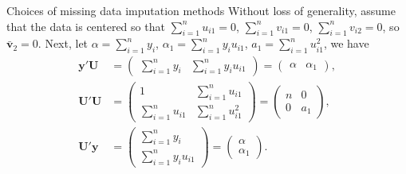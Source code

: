 \begin{frame}{Choices of missing data imputation methods}
Without loss of generality, assume that the data is centered so that $\sum\limits_{i=1}^n u_{i1} = 0$, $\sum\limits_{i=1}^n v_{i1} = 0$, $\sum\limits_{i=1}^n v_{i2} = 0$, so $\bar{\mathbf{v}}_2 = 0$. Next, let $\alpha = \sum\limits_{i=1}^ny_i$, $\alpha_1 = \sum\limits_{i=1}^n y_iu_{i1}$, $a_1=\sum\limits_{i=1}^n u_{i1}^2$, we have
    \vspace{-5pt}
    \begin{align*}
        \mathbf{y}'\mathbf{U} &= \begin{pmatrix}
        \sum\limits_{i=1}^ny_i & \sum\limits_{i=1}^n y_iu_{i1}
        \end{pmatrix} = \begin{pmatrix}
            \alpha & \alpha_1
        \end{pmatrix},\\
        \mathbf{U}'\mathbf{U} &= \begin{pmatrix}
            1 & \sum\limits_{i=1}^n u_{i1}\\
            \sum\limits_{i=1}^n u_{i1} & \sum\limits_{i=1}^n u_{i1}^2
        \end{pmatrix} = \begin{pmatrix}
            n & 0 \\ 0 & a_1
        \end{pmatrix},\\
        \mathbf{U}'\mathbf{y} &= \begin{pmatrix}
            \sum\limits_{i=1}^n y_i \\ \sum\limits_{i=1}^n y_iu_{i1}
        \end{pmatrix} = \begin{pmatrix}
            \alpha \\ \alpha_1
        \end{pmatrix}.
    \end{align*}
\end{frame}
